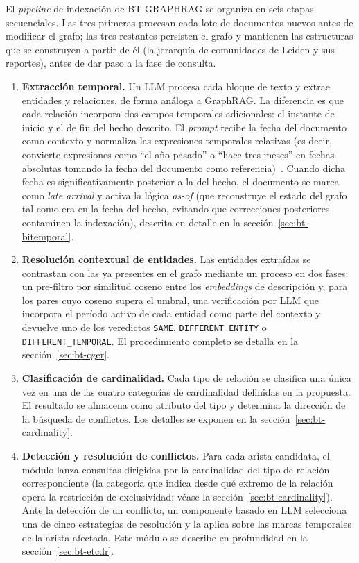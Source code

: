 El \emph{pipeline} de indexación de BT-GRAPHRAG se organiza en seis etapas secuenciales. Las tres primeras procesan cada lote de documentos nuevos antes de modificar el grafo; las tres restantes persisten el grafo y mantienen las estructuras que se construyen a partir de él (la jerarquía de comunidades de Leiden y sus reportes), antes de dar paso a la fase de consulta.

\begin{enumerate}
    \item \textbf{Extracción temporal.} Un LLM procesa cada bloque de texto y extrae entidades y relaciones, de forma análoga a GraphRAG. La diferencia es que cada relación incorpora dos campos temporales adicionales: el instante de inicio y el de fin del hecho descrito. El \emph{prompt} recibe la fecha del documento como contexto y normaliza las expresiones temporales relativas (es decir, convierte expresiones como ``el año pasado'' o ``hace tres meses'' en fechas absolutas tomando la fecha del documento como referencia)~\cite{TODO_temporal_normalization}. Cuando dicha fecha es significativamente posterior a la del hecho, el documento se marca como \emph{late arrival} y activa la lógica \emph{as-of} (que reconstruye el estado del grafo tal como era en la fecha del hecho, evitando que correcciones posteriores contaminen la indexación), descrita en detalle en la sección~\ref{sec:bt-bitemporal}.
    \item \textbf{Resolución contextual de entidades.} Las entidades extraídas se contrastan con las ya presentes en el grafo mediante un proceso en dos fases: un pre-filtro por similitud coseno entre los \emph{embeddings} de descripción y, para los pares cuyo coseno supera el umbral, una verificación por LLM que incorpora el período activo de cada entidad como parte del contexto y devuelve uno de los veredictos \texttt{SAME}, \texttt{DIFFERENT\_ENTITY} o \texttt{DIFFERENT\_TEMPORAL}. El procedimiento completo se detalla en la sección~\ref{sec:bt-cger}.
    \item \textbf{Clasificación de cardinalidad.} Cada tipo de relación se clasifica una única vez en una de las cuatro categorías de cardinalidad definidas en la propuesta. El resultado se almacena como atributo del tipo y determina la dirección de la búsqueda de conflictos. Los detalles se exponen en la sección~\ref{sec:bt-cardinality}.
    \item \textbf{Detección y resolución de conflictos.} Para cada arista candidata, el módulo lanza consultas dirigidas por la cardinalidad del tipo de relación correspondiente (la categoría que indica desde qué extremo de la relación opera la restricción de exclusividad; véase la sección~\ref{sec:bt-cardinality}). Ante la detección de un conflicto, un componente basado en LLM selecciona una de cinco estrategias de resolución y la aplica sobre las marcas temporales de la arista afectada. Este módulo se describe en profundidad en la sección~\ref{sec:bt-etcdr}.

\end{enumerate}
